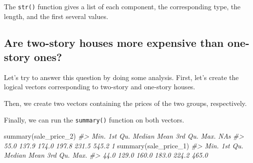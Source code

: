 \documentclass[
]{book}
\newenvironment{Shaded}{\begin{snugshade}}{\end{snugshade}}
\newcommand{\CommentTok}[1]{\textcolor[rgb]{0.56,0.35,0.01}{\textit{#1}}}
\newcommand{\FunctionTok}[1]{\textcolor[rgb]{0.00,0.00,0.00}{#1}}
\newcommand{\NormalTok}[1]{#1}
\newcommand{\OtherTok}[1]{\textcolor[rgb]{0.56,0.35,0.01}{#1}}
\newcommand{\SpecialCharTok}[1]{\textcolor[rgb]{0.00,0.00,0.00}{#1}}
\newcommand{\StringTok}[1]{\textcolor[rgb]{0.31,0.60,0.02}{#1}}
\begin{document}
The \texttt{str()} function gives a list of each component, the corresponding type, the length, and the first several values.

\hypertarget{are-two-story-houses-more-expensive-than-one-story-ones}{%
\subsection{Are two-story houses more expensive than one-story ones?}\label{are-two-story-houses-more-expensive-than-one-story-ones}}

Let's try to answer this question by doing some analysis. First, let's create the logical vectors corresponding to two-story and one-story houses.

\begin{Shaded}
\end{Shaded}

Then, we create two vectors containing the prices of the two groups, respectively.

\begin{Shaded}
\end{Shaded}

Finally, we can run the \texttt{summary()} function on both vectors.

\begin{Shaded}
\begin{Highlighting}[]
\FunctionTok{summary}\NormalTok{(sale\_price\_2)}
\CommentTok{\#\textgreater{}    Min. 1st Qu.  Median    Mean 3rd Qu.    Max.    NA\textquotesingle{}s }
\CommentTok{\#\textgreater{}    55.0   137.9   174.0   197.8   231.5   545.2       1}
\FunctionTok{summary}\NormalTok{(sale\_price\_1)}
\CommentTok{\#\textgreater{}    Min. 1st Qu.  Median    Mean 3rd Qu.    Max. }
\CommentTok{\#\textgreater{}    44.0   129.0   160.0   183.0   224.2   465.0}
\end{Highlighting}
\end{Shaded}
\end{document}
